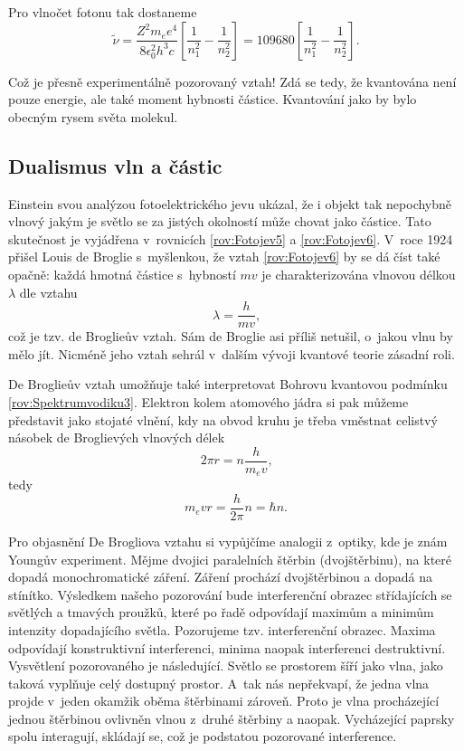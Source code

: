 \noindent Pro vlnočet fotonu tak dostaneme
\begin{equation}
\tilde{\nu} = \frac{Z^2m_e e^4}{8\epsilon_0^2 h^3c}\left[ \frac{1}{n_1^2} - \frac{1}{n_2^2} \right ] = 109680 \left[ \frac{1}{n_1^2} - \frac{1}{n_2^2} \right ].
\label{rov:Spektrumvodiku9}
\end{equation}

\noindent Což je přesně experimentálně pozorovaný vztah! Zdá se tedy, že kvantována není pouze energie, ale také moment hybnosti částice. Kvantování jako by bylo obecným rysem světa molekul. 

\subsection{Dualismus vln a částic}

Einstein svou analýzou fotoelektrického jevu ukázal, že i objekt tak nepochybně vlnový jakým je světlo se za jistých okolností může chovat jako částice. Tato skutečnost je vyjádřena v~rovnicích \ref{rov:Fotojev5} a \ref{rov:Fotojev6}. V~roce 1924 přišel Louis de Broglie s~myšlenkou, že vztah \ref{rov:Fotojev6} by se dá číst také opačně: každá hmotná částice s~hybností $mv$ je charakterizována vlnovou délkou $\lambda$ dle vztahu
\begin{equation}
\boxed{\lambda = \frac{h}{mv}\mbox{,}}
\label{rov:Dualismus1}
\end{equation}
\noindent což je tzv. de Broglieův vztah. Sám de Broglie asi příliš netušil, o~jakou vlnu by mělo jít. Nicméně jeho vztah sehrál v~dalším vývoji kvantové teorie zásadní roli. 

De Broglieův vztah umožňuje také interpretovat Bohrovu kvantovou podmínku \ref{rov:Spektrumvodiku3}. Elektron kolem atomového jádra si pak můžeme představit jako stojaté vlnění, kdy na obvod kruhu je třeba vměstnat celistvý násobek de Broglievých vlnových délek
\begin{equation}
2\pi r = n \frac{h}{m_e v}\mbox{,}
\label{Dualismus2}
\end{equation}
tedy
\begin{equation}
m_e vr = \frac{h}{2\pi}n = \hbar n \mbox{.}
\label{Dualismus3}
\end{equation}

Pro objasnění De Brogliova vztahu si vypůjčíme analogii z~optiky, kde je znám Youngův experiment. Mějme dvojici paralelních štěrbin (dvojštěrbinu), na které dopadá monochromatické záření. Záření prochází dvojštěrbinou a  dopadá na stínítko. Výsledkem našeho pozorování bude interferenční obrazec střídajících se světlých a tmavých proužků, které po řadě odpovídají maximům a minimům intenzity dopadajícího světla. Pozorujeme tzv. interferenční obrazec. Maxima odpovídají konstruktivní interferenci, minima naopak interferenci destruktivní. Vysvětlení pozorovaného je následující. Světlo se prostorem šíří jako vlna, jako taková vyplňuje celý dostupný prostor. A~tak nás nepřekvapí, že jedna vlna projde v~jeden okamžik oběma štěrbinami zároveň. Proto je vlna procházející jednou štěrbinou ovlivněn vlnou z~druhé štěrbiny a naopak. Vycházející paprsky spolu interagují, skládají se, což je podstatou pozorované interference.

